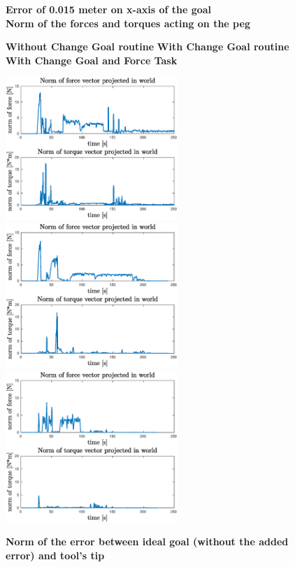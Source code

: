 \begin{figure}[H]
	\centering
	\textbf{Error of 0.015 meter on x-axis of the goal\\}
	\vspace{30px}
	\textbf{Norm of the forces and torques acting on the peg\\}
	\vspace{10px}
	\centerline{
	\hspace{5px}
	\textbf{Without Change Goal routine} 
	\hspace{35px}
	\textbf{With Change Goal routine}
	\hspace{25px}
	\textbf{With Change Goal and Force Task} 
	}
	\centerline{ 
		\includegraphics[width=6.5cm]{error_nothing/forcesNorm.eps}
		\includegraphics[width=6.5cm]{error_goal/forceNorm.eps}
	 	\includegraphics[width=6.5cm]{error_all/forceNorm.eps}
	}
	\vspace{30px}
	\textbf{Norm of the error between ideal goal (without the added error) and tool's tip\\}

\end{figure}
